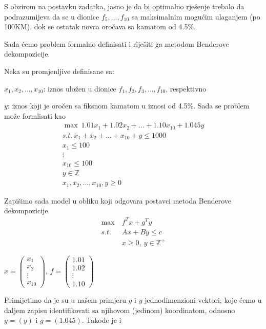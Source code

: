 \documentclass[a4paper, utf8, 11pt, colorlinks]{book}
\begin{document}
S obzirom na postavku zadatka, jasno je da bi optimalno rješenje trebalo da podrazumijeva da se u dionice $f_5,\ldots,f_{10}$ sa maksimalnim mogućim ulaganjem (po 100KM), dok se ostatak novca oročava sa kamatom od  4.5\%.

Sada ćemo problem formalno definisati i riješiti ga metodom Benderove dekompozicije.

Neka su promjenljive definisane sa:

$x_1,x_2,\ldots,x_{10}$: iznos uložen u dionice $f_1, f_2, f_3,\ldots,f_{10}$, respektivno

$y$: iznos koji je oročen sa fiksnom kamatom u iznosi od 4.5\%. Sada se problem može formlisati kao
\begin{equation}\label{primer:formulacija1}
	\begin{aligned}
		\max\ 1.01x_1+1.02x_2+\ldots+1.10x_{10}+1.045y\\
		s.t.\ x_1+x_2+\ldots+x_{10}+y\leqslant1000\\
		x_1\leqslant 100\\
		\vdots \\
		x_{10}\leqslant 100\\
		y\in \mathbb{Z}\\
		x_1,x_2,\ldots,x_{10},y\geqslant 0
	\end{aligned}
\end{equation}

Zapišimo sada model u obliku koji odgovara postavci metoda Benderove dekompozicije.
 \begin{equation}\label{primer:formulacija2}
	\begin{aligned}
		\max\  &f^Tx+g^Ty\\
		s.t.\  &Ax+By\leqslant c\\
		&x\geqslant 0,\ y \in \mathbb{Z}^+
	\end{aligned}
\end{equation}


$x=\left(\begin{array}{c}
	x_1 \\
	x_2 \\
	\vdots \\
	x_{10}
\end{array}\right)$,  
$f = \left(\begin{array}{c}
	1.01 \\
	1.02 \\
	\vdots \\
	1.10
\end{array}\right)$

Primijetimo da je su u našem primjeru $g$ i $y$ jednodimenzioni vektori, koje ćemo u daljem zapisu identifikovati sa njihovom (jedinom) koordinatom, odnosno
$y=(y)$ i $g=(1.045)$. Takođe je i 
\end{document}
